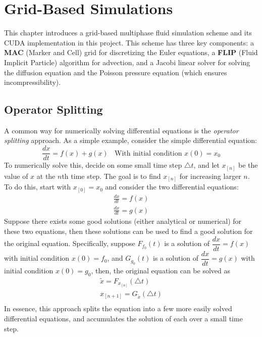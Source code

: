 \chapter{Grid-Based Simulations}
\label{chapter grid}

This chapter introduces a grid-based multiphase fluid simulation scheme and its CUDA implementation in this project. This scheme has three key components: a \textbf{MAC} (Marker and Cell) grid for discretizing the Euler equations, a \textbf{FLIP} (Fluid Implicit Particle) algorithm for advection, and a Jacobi linear solver for solving the diffusion equation and the Poisson pressure equation (which ensures incompressibility).

\section{Operator Splitting}
\label{section splitting}
A common way for numerically solving differential equations is the \textit{operator splitting} approach. As a simple example, consider the simple differential equation:
$$
\frac{dx}{dt} = f(x)+g(x) ~~~~\mbox{With initial condition $x(0)=x_0$}
$$
To numerically solve this, decide on some small time step $\triangle t$, and let $x_{[n]}$ be the value of $x$ at the $n$th time step. The goal is to find $x_{[n]}$ for increasing larger $n$. To do this, start with $x_{[0]}=x_0$ and consider the two differential equations:
\begin{equation*}
    \begin{aligned}
        \frac{dx}{dt} = f(x)\\
        \frac{dx}{dt} = g(x)
    \end{aligned}
\end{equation*}
Suppose there exists some good solutions (either analytical or numerical) for these two equations, then these solutions can be used to find a good solution for the original equation. Specifically, suppose $F_{f_0}(t)$ is a solution of $\dfrac{dx}{dt} = f(x)$ with initial condition $x(0)=f_0$, and $G_{g_0}(t)$ is a solution of $\dfrac{dx}{dt} = g(x)$ with initial condition $x(0)=g_0$, then, the original equation can be solved as 
\begin{equation*}
    \begin{aligned}
        \widetilde{x} = F_{x_{[n]}}(\triangle t) \\
        x_{[n+1]} = G_{\widetilde{x}}(\triangle t) \\
    \end{aligned}
\end{equation*}
In essence, this approach splits the equation into a few more easily solved differential equations, and accumulates the solution of each over a small time step. 

